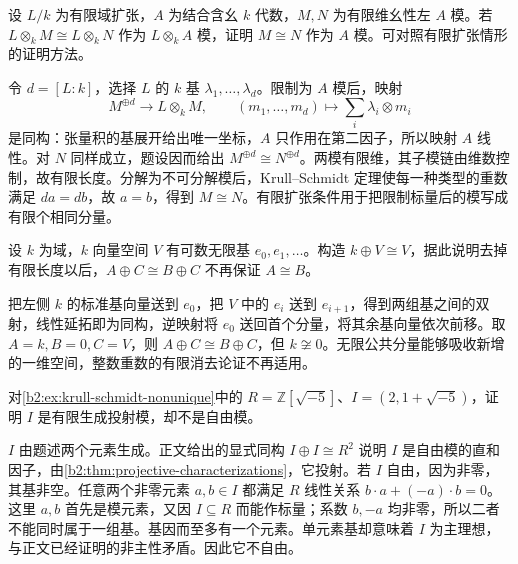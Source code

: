 \begin{exercise}\label{b2:ex:12-finite-extension-descent}
	设 \(L/k\) 为有限域扩张，\(A\) 为结合含幺 \(k\) 代数，\(M,N\) 为有限维幺性左 \(A\) 模。若 \(L\otimes_kM\cong L\otimes_kN\) 作为 \(L\otimes_kA\) 模，证明 \(M\cong N\) 作为 \(A\) 模。可对照有限扩张情形的证明方法\cite[Problem 3.8.4(i), pp. 52--53]{EtingofEtAl2011RepresentationTheory}。
\end{exercise}
\begin{solution}
	令 \(d=[L:k]\)，选择 \(L\) 的 \(k\) 基 \(\lambda_1,\ldots,\lambda_d\)。限制为 \(A\) 模后，映射
	\[
		M^{\oplus d}\longrightarrow L\otimes_kM,\qquad (m_1,\ldots,m_d)\longmapsto\sum_i\lambda_i\otimes m_i
	\]
	是同构：张量积的基展开给出唯一坐标，\(A\) 只作用在第二因子，所以映射 \(A\) 线性。对 \(N\) 同样成立，题设因而给出 \(M^{\oplus d}\cong N^{\oplus d}\)。两模有限维，其子模链由维数控制，故有限长度。分解为不可分解模后，Krull–Schmidt 定理使每一种类型的重数满足 \(d a=d b\)，故 \(a=b\)，得到 \(M\cong N\)。有限扩张条件用于把限制标量后的模写成有限个相同分量。
\end{solution}

\begin{exercise}\label{b2:ex:12-infinite-cancellation}
	设 \(k\) 为域，\(k\) 向量空间 \(V\) 有可数无限基 \(e_0,e_1,\ldots\)。构造 \(k\oplus V\cong V\)，据此说明去掉有限长度以后，\(A\oplus C\cong B\oplus C\) 不再保证 \(A\cong B\)。
\end{exercise}
\begin{solution}
	把左侧 \(k\) 的标准基向量送到 \(e_0\)，把 \(V\) 中的 \(e_i\) 送到 \(e_{i+1}\)，得到两组基之间的双射，线性延拓即为同构，逆映射将 \(e_0\) 送回首个分量，将其余基向量依次前移。取 \(A=k,B=0,C=V\)，则 \(A\oplus C\cong B\oplus C\)，但 \(k\not\cong0\)。无限公共分量能够吸收新增的一维空间，整数重数的有限消去论证不再适用。
\end{solution}

\begin{exercise}\label{b2:ex:12-nonprincipal-projective}
	对\cref{b2:ex:krull-schmidt-nonunique}中的 \(R=\mathbb Z[\sqrt{-5}]\)、\(I=(2,1+\sqrt{-5})\)，证明 \(I\) 是有限生成投射模，却不是自由模。
\end{exercise}
\begin{solution}
	\(I\) 由题述两个元素生成。正文给出的显式同构 \(I\oplus I\cong R^2\) 说明 \(I\) 是自由模的直和因子，由\cref{b2:thm:projective-characterizations}，它投射。若 \(I\) 自由，因为非零，其基非空。任意两个非零元素 \(a,b\in I\) 都满足 \(R\) 线性关系 \(b\cdot a+(-a)\cdot b=0\)。这里 \(a,b\) 首先是模元素，又因 \(I\subseteq R\) 而能作标量；系数 \(b,-a\) 均非零，所以二者不能同时属于一组基。基因而至多有一个元素。单元素基却意味着 \(I\) 为主理想，与正文已经证明的非主性矛盾。因此它不自由。
\end{solution}

